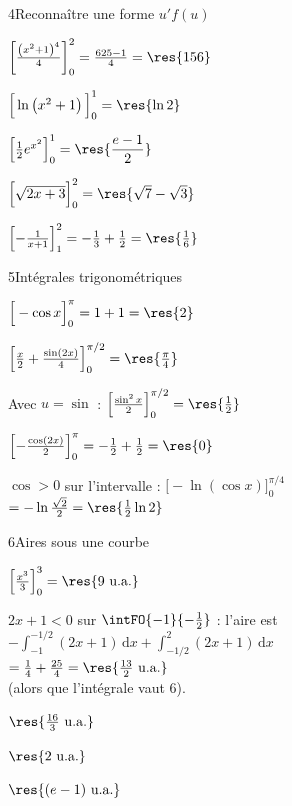 \begin{deuxcolonnes}
\begin{corrige}{4}{Reconnaître une forme $u'f(u)$}
\begin{questions}
  \item $\left[\frac{\left(x^{2}+1\right)^{4}}{4}\right]_0^2=\frac{625-1}{4}=\res{156}$
  \item $\Big[\ln\left(x^{2}+1\right)\Big]_0^1=\res{\ln2}$
  \item $\left[\frac12e^{x^{2}}\right]_0^1=\res{\dfrac{e-1}{2}}$
  \item $\Big[\sqrt{2x+3}\Big]_0^2=\res{\sqrt7-\sqrt3}$
  \item $\left[-\frac{1}{x+1}\right]_1^2=-\frac13+\frac12=\res{\frac16}$
\end{questions}
\end{corrige}

\begin{corrige}{5}{Intégrales trigonométriques}
\begin{questions}
  \item $\Big[-\cos x\Big]_0^{\pi}=1+1=\res{2}$
  \item $\left[\frac x2+\frac{\sin(2x)}{4}\right]_0^{\pi/2}=\res{\frac{\pi}{4}}$
  \item Avec $u=\sin$ : $\left[\frac{\sin^{2}x}{2}\right]_0^{\pi/2}=\res{\frac12}$
  \item $\left[-\frac{\cos(2x)}{2}\right]_0^{\pi}=-\frac12+\frac12=\res{0}$
  \item $\cos>0$ sur l'intervalle : $\Big[-\ln(\cos x)\Big]_0^{\pi/4}$\\ $=-\ln\frac{\sqrt2}{2}=\res{\frac12\ln2}$
\end{questions}
\end{corrige}

\begin{corrige}{6}{Aires sous une courbe}
\begin{questions}
  \item $\left[\frac{x^{3}}{3}\right]_0^3=\res{9\text{ u.a.}}$
  \item $2x+1<0$ sur $\intFO{-1}{-\frac12}$ : l'aire est\\ $-\int_{-1}^{-1/2}(2x+1)\,\mathrm{d}x+\int_{-1/2}^2(2x+1)\,\mathrm{d}x$\\
    $=\frac14+\frac{25}{4}=\res{\frac{13}{2}\text{ u.a.}}$\\ (alors que l'intégrale vaut $6$).
  \item $\res{\frac{16}{3}\text{ u.a.}}$
  \item $\res{2\text{ u.a.}}$
  \item $\res{(e-1)\text{ u.a.}}$
\end{questions}
\end{corrige}


\end{deuxcolonnes}
